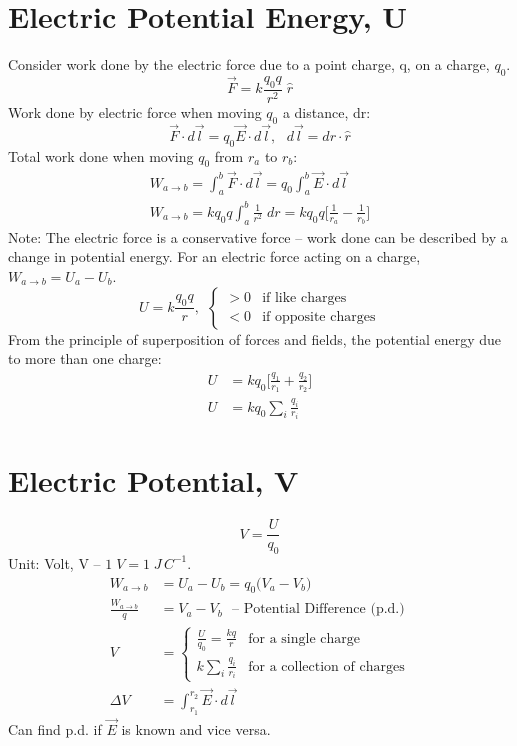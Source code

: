 \documentclass[a4paper, 11pt, normalem]{report}
\begin{document}
\section{Electric Potential Energy, U}
Consider work done by the electric force due to a point charge, q, on a charge, $q_{0}$.
\begin{equation}
    \vec{F} = k \frac{q_{0} q}{r^{2}} \; \hat{r}
\end{equation}
Work done by electric force when moving $q_{0}$ a distance, dr:
\begin{equation}
    \vec{F} \cdot d\vec{l} = q_{0}\vec{E} \cdot d\vec{l}, ~~~ d\vec{l} = dr \cdot \hat{r}
\end{equation}
Total work done when moving $q_{0}$ from $r_{a}$ to $r_{b}$:
\begin{gather}
    W_{a \to b} = \int_{a}^{b} \vec{F} \cdot d\vec{l} = q_{0} \int_{a}^{b} \vec{E} \cdot d\vec{l} \\
    W_{a \to b} = k q_{0} q \int_{a}^{b} \frac{1}{r^{2}} \; dr = k q_{0} q \Big[\frac{1}{r_{a}} - \frac{1}{r_{b}} \Big]
\end{gather}
Note: The electric force is a conservative force -- work done can be described by a change in potential energy.
For an electric force acting on a charge, $W_{a \to b} = U_{a} - U_{b}$.
\begin{equation}
    U = k \frac{q_{0} q}{r}, ~~
    \begin{cases}
        > 0 & \text{if like charges} \\
        < 0 & \text{if opposite charges}
    \end{cases}
\end{equation}
From the principle of superposition of forces and fields, the potential energy due to more than one charge:
\begin{align}
    U &= kq_{0}\Big[\frac{q_{1}}{r_{1}} + \frac{q_{2}}{r_{2}} \Big]\\
    U &= kq_{0} \sum_{i} \frac{q_{i}}{r_{i}}
\end{align}

\section{Electric Potential, V}
\begin{equation}
    V = \frac{U}{q_{0}}
\end{equation}
Unit: Volt, V -- $1\;V = 1\;J\,C^{-1}$.
\begin{align}
    W_{a \to b} &= U_{a} - U_{b} = q_{0} \big(V_{a} - V_{b}\big) \\
    \frac{W_{a \to b}}{q} &= V_{a} - V_{b} ~~~ \text{-- Potential Difference (p.d.)} \\
    V &=
    \begin{cases}
        \frac{U}{q_{0}} = \frac{kq}{r} & \text{for a single charge} \\
        k \sum_{i} \frac{q_{i}}{r_{i}} & \text{for a collection of charges}
    \end{cases} \\
    \Delta V &= \int_{r_{1}}^{r_{2}} \vec{E} \cdot d\vec{l}
\end{align}
Can find p.d. if $\vec{E}$ is known and vice versa.
\end{document}
